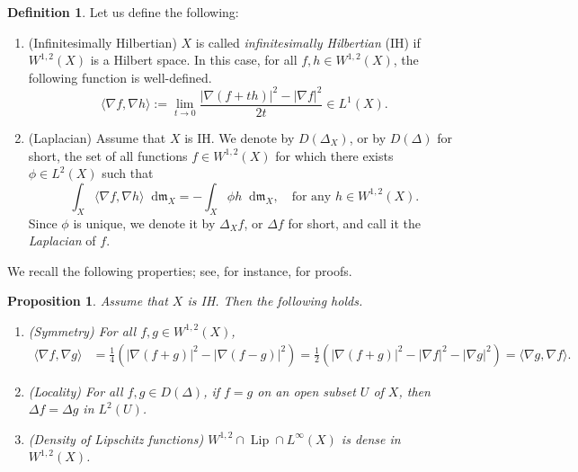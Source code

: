 \documentclass[11pt,reqno]{amsart}
\newtheorem{proposition}[theorem]{Proposition}
\theoremstyle{definition}
\newtheorem{definition}[theorem]{Definition}
\numberwithin{equation}{section}
\newcommand{\di}{\mathop{}\!\mathrm{d}}
\newcommand{\meas}{\mathfrak{m}}
\DeclareMathOperator{\Lip}{Lip}
\begin{document}
\begin{definition}\label{def:laplacian}
    Let us define the following:
    \begin{enumerate}
        \item{(Infinitesimally Hilbertian)}   $X$ is called \textit{infinitesimally Hilbertian} (IH) if  $W^{1,2}(X)$ is a Hilbert space.
In this case, for all $f, h \in W^{1,2}(X)$, the following function is well-defined.
\begin{equation}
\langle \nabla f, \nabla h\rangle := \lim_{t \to 0}\frac{|\nabla (f+th)|^2-|\nabla f|^2}{2t} \in L^1(X).
\end{equation}
        \item{(Laplacian)} Assume that $X$ is IH. We denote by $D(\Delta_X)$, or by $D(\Delta)$ for short, the set of all functions $f \in W^{1,2}(X)$ for which there exists $\phi \in L^2(X)$ such that 
    \begin{equation*}
\int_X\langle \nabla f, \nabla h\rangle \di \meas_X=-\int_X\phi h\di \meas_X,\quad \text{for any $h \in W^{1,2}(X)$.}
\end{equation*}
    Since $\phi$ is unique, we denote it by $\Delta_X f$, or $\Delta f$ for short, and call it the \textit{Laplacian} of $f$.
    \end{enumerate}
\end{definition}
We recall the following properties; see, for instance, \cite{GP2} for proofs.
\begin{proposition}\label{laplocal}
Assume that $X$ is IH. Then the following holds.
    \begin{enumerate}
    \item{(Symmetry)} For all $f, g \in W^{1,2}(X)$,
    \begin{align*}
    \langle \nabla f, \nabla g\rangle &=\frac{1}{4}\left(|\nabla (f+g)|^2-|\nabla (f-g)|^2\right) =\frac{1}{2}\left(|\nabla (f+g)|^2-|\nabla f|^2-|\nabla g|^2\right)=\langle \nabla g, \nabla f\rangle.
\end{align*}
    \item{(Locality)} For all $f,g \in D(\Delta)$, if $f=g$ on an open subset $U$ of $X$, then $\Delta f= \Delta g$ in $L^2(U)$.
    \item{(Density of Lipschitz functions)} $W^{1,2} \cap \Lip  \cap L^{\infty}(X)$ is dense in $W^{1,2}(X)$.
\end{enumerate}
\end{proposition}
\end{document}
